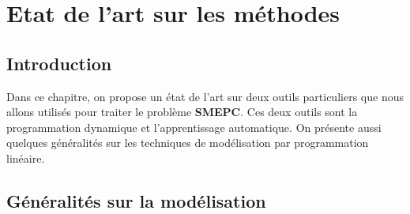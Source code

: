 \chapter{Etat de l'art sur les méthodes  }%
\label{Etat_art_methode}
\minitoc
\newpage
\section{Introduction}
Dans ce chapitre, on propose un état de l'art sur deux outils particuliers que nous allons utilisés pour traiter le problème \textbf{SMEPC}.  Ces deux outils sont la programmation dynamique et l'apprentissage automatique. On présente aussi quelques généralités sur les techniques de modélisation par programmation linéaire.

\section{Généralités sur la modélisation}

